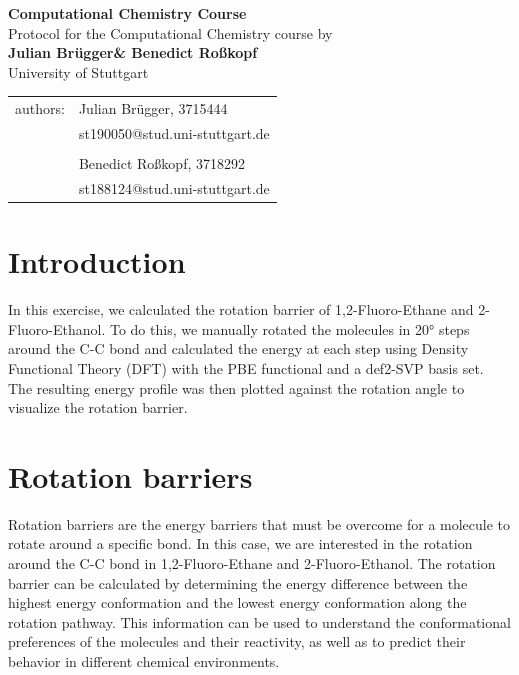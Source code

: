 \documentclass[a4paper,12pt]{scrartcl}
\makeatletter
\newcommand{\VerfasserEINS}{Julian Brügger}
\newcommand{\MatNoEINS}{3715444}
\newcommand{\EmailEINS}{st190050@stud.uni-stuttgart.de}
\newcommand{\VerfasserZWEI}{Benedict Roßkopf}
\newcommand{\MatNoZWEI}{3718292}
\newcommand{\EmailZWEI}{st188124@stud.uni-stuttgart.de}
\newcommand{\VERSUCHSNAME}{Computational Chemistry Course}
\makeatother
\begin{document}
\begin{titlepage}
\begin{center}
\Huge{\textbf{\VERSUCHSNAME}}\\
\vspace{10mm}
\Large{Protocol for the Computational Chemistry course by \\ \textbf{\VerfasserEINS\;\& \VerfasserZWEI }}\\
\vspace{10mm} 
\Large{University of Stuttgart}\\
\end{center}
\begin{center}
\begin{tabular}{ll}
\large{authors:}        & \large{\VerfasserEINS, \MatNoEINS} \\
                        & \large{\EmailEINS} \\
                        \vspace{2mm}\\
                        & \large{\VerfasserZWEI, \MatNoZWEI} \\
                        & \large{\EmailZWEI} \\
\end{tabular}
\end{center}
\end{titlepage}

\section{Introduction}

In this exercise, we calculated the rotation barrier of 1,2-Fluoro-Ethane and 2-Fluoro-Ethanol.
To do this, we manually rotated the molecules in 20° steps around the C-C bond and calculated the energy at each step using Density Functional Theory (DFT) with the PBE functional and a def2-SVP basis set. The resulting energy profile was then plotted against the rotation angle to visualize the rotation barrier.


\section{Rotation barriers}

Rotation barriers are the energy barriers that must be overcome for a molecule to rotate around a specific bond. 
In this case, we are interested in the rotation around the C-C bond in 1,2-Fluoro-Ethane and 2-Fluoro-Ethanol. 
The rotation barrier can be calculated by determining the energy difference between the highest energy conformation and the lowest energy conformation along the rotation pathway.
This information can be used to understand the conformational preferences of the molecules and their reactivity, as well as to predict their behavior in different chemical environments.
\end{document}
